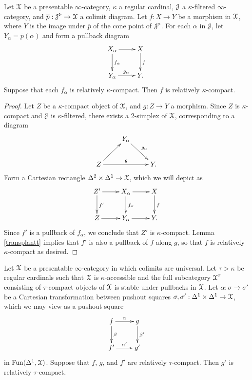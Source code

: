 \begin{lemma}\label{sumarus}
Let $\operatorname{\mathcal{X}}$ be a presentable $\infty$-category, $\kappa$ a regular cardinal, $\operatorname{\mathcal{J}}$ a $\kappa$-filtered $\infty$-category, and $\overline{p}: \operatorname{\mathcal{J}}^{\triangleright} \rightarrow \operatorname{\mathcal{X}}$ a colimit diagram. Let $f: X \rightarrow Y$ be a morphism in $\operatorname{\mathcal{X}}$, where $Y$ is the image
under $\overline{p}$ of the cone point of $\operatorname{\mathcal{J}}^{\triangleright}$. For each $\alpha$ in $\operatorname{\mathcal{J}}$, let $Y_{\alpha} = \overline{p}(\alpha)$ and form a pullback diagram
$$ \xymatrix{ X_{\alpha} \ar[r] \ar[d]^{f_{\alpha}} & X \ar[d]^{f} \\
Y_{\alpha} \ar[r]^{g_{\alpha}} & Y. }$$
Suppose that each $f_{\alpha}$ is relatively $\kappa$-compact. Then $f$ is relatively $\kappa$-compact.
\end{lemma}

\begin{proof}
Let $Z$ be a $\kappa$-compact object of $\operatorname{\mathcal{X}}$, and $g: Z \rightarrow Y$ a morphism.
Since $Z$ is $\kappa$-compact and $\operatorname{\mathcal{J}}$ is $\kappa$-filtered, there exists a $2$-simplex of $\operatorname{\mathcal{X}}$, corresponding to a diagram
$$ \xymatrix{ & Y_{\alpha} \ar[dr]^{g_{\alpha}} & \\
Z \ar[ur] \ar[rr]^{g} & & Y. }$$
Form a Cartesian rectangle $\Delta^2 \times \Delta^1 \rightarrow \operatorname{\mathcal{X}}$, which we will depict
as
$$ \xymatrix{ Z' \ar[r] \ar[d]^{f'} & X_{\alpha} \ar[r] \ar[d]^{f_{\alpha}} & X \ar[d]^{f} \\
Z \ar[r] & Y_{\alpha} \ar[r] & Y. }$$
Since $f'$ is a pullback of $f_{\alpha}$, we conclude that $Z'$ is $\kappa$-compact. 
Lemma \ref{transplantt} implies that $f'$ is also a pullback of $f$ along $g$, so that $f$ is relatively $\kappa$-compact as desired.
\end{proof}

\begin{lemma}\label{sumaris}
Let $\operatorname{\mathcal{X}}$ be a presentable $\infty$-category in which colimits are universal. Let $\tau > \kappa$ be regular cardinals such that
$\operatorname{\mathcal{X}}$ is $\kappa$-accessible and the full subcategory $\operatorname{\mathcal{X}}^{\tau}$ consisting of $\tau$-compact objects of $\operatorname{\mathcal{X}}$ is stable under pullbacks in $\operatorname{\mathcal{X}}$. Let $\alpha: \sigma \rightarrow \sigma'$ be a Cartesian transformation between pushout squares $\sigma, \sigma': \Delta^1 \times \Delta^1 \rightarrow \operatorname{\mathcal{X}}$, which we may view as a pushout square
$$ \xymatrix{ f \ar[r]^{\alpha} \ar[d]^{\beta} & g \ar[d]^{\beta'} \\
f' \ar[r]^{\alpha'} & g' }$$
in $\operatorname{Fun}(\Delta^1,\operatorname{\mathcal{X}})$. Suppose that $f$, $g$, and $f'$ are relatively $\tau$-compact. Then $g'$ is relatively $\tau$-compact. 
\end{lemma}

